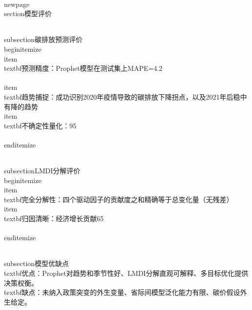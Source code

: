 \\newpage
\\section{模型评价}

\\subsection{碳排放预测评价}
\\begin{itemize}
    \\item \\textbf{预测精度}：Prophet模型在测试集上MAPE=4.2\\%
    \\item \\textbf{趋势捕捉}：成功识别2020年疫情导致的碳排放下降拐点，以及2021年后稳中有降的趋势
    \\item \\textbf{不确定性量化}：95\\%
\\end{itemize}

\\subsection{LMDI分解评价}
\\begin{itemize}
    \\item \\textbf{完全分解性}：四个驱动因子的贡献度之和精确等于总变化量（无残差）
    \\item \\textbf{归因清晰}：经济增长贡献65\\%
\\end{itemize}

\\subsection{模型优缺点}
\\textbf{优点}：Prophet对趋势和季节性好、LMDI分解直观可解释、多目标优化提供决策权衡。
\\textbf{缺点}：未纳入政策突变的外生变量、省际间模型泛化能力有限、碳价假设外生给定。
